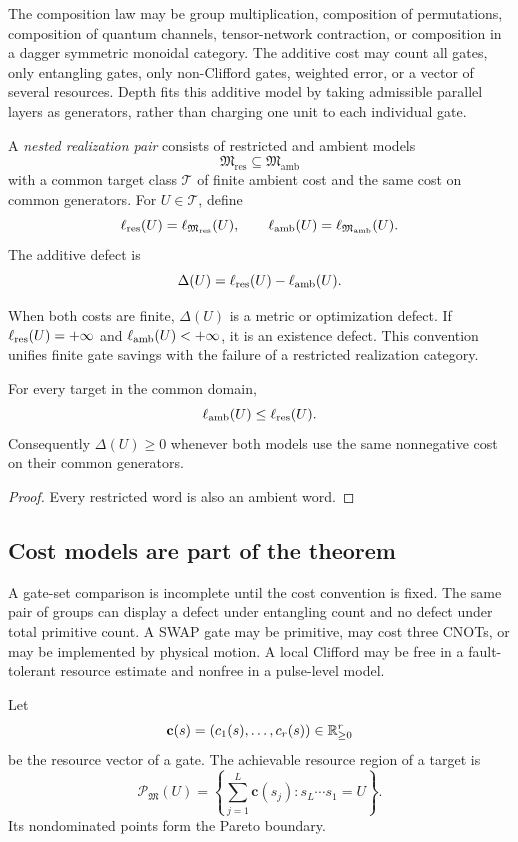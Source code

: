 The composition law may be group multiplication, composition of permutations, composition of quantum channels, tensor-network contraction, or composition in a dagger symmetric monoidal category.  The additive cost may count all gates, only entangling gates, only non-Clifford gates, weighted error, or a vector of several resources.  Depth fits this additive model by taking admissible parallel layers as generators, rather than charging one unit to each individual gate.

\begin{definition}
A \emph{nested realization pair} consists of restricted and ambient models
\[
\mathfrak M_{\mathrm{res}}\subseteq\mathfrak M_{\mathrm{amb}}
\]
with a common target class $\mathcal T$ of finite ambient cost and the same cost on common generators.  For $U\in\mathcal T$, define
\[
\ell_{\mathrm{res}}(U)=\ell_{\mathfrak M_{\mathrm{res}}}(U),
\qquad
\ell_{\mathrm{amb}}(U)=\ell_{\mathfrak M_{\mathrm{amb}}}(U).
\]
The additive defect is
\[
\Delta(U)=\ell_{\mathrm{res}}(U)-\ell_{\mathrm{amb}}(U).
\]
\end{definition}

When both costs are finite, $\Delta(U)$ is a metric or optimization defect.  If $\ell_{\mathrm{res}}(U)=+\infty$ and $\ell_{\mathrm{amb}}(U)<+\infty$, it is an existence defect.  This convention unifies finite gate savings with the failure of a restricted realization category.

\begin{proposition}[Monotonicity]
For every target in the common domain,
\[
\ell_{\mathrm{amb}}(U)\le \ell_{\mathrm{res}}(U).
\]
Consequently $\Delta(U)\ge0$ whenever both models use the same nonnegative cost on their common generators.
\end{proposition}
\begin{proof}
Every restricted word is also an ambient word.
\end{proof}

\subsection{Cost models are part of the theorem}
A gate-set comparison is incomplete until the cost convention is fixed.  The same pair of groups can display a defect under entangling count and no defect under total primitive count.  A SWAP gate may be primitive, may cost three CNOTs, or may be implemented by physical motion.  A local Clifford may be free in a fault-tolerant resource estimate and nonfree in a pulse-level model.

\begin{definition}
Let
\[
\mathbf c(s)=(c_1(s),\ldots,c_r(s))\in\mathbb R_{\ge0}^r
\]
be the resource vector of a gate.  The achievable resource region of a target is
\[
\mathcal P_{\mathfrak M}(U)
=
\left\{
\sum_{j=1}^L\mathbf c(s_j):s_L\cdots s_1=U
\right\}.
\]
Its nondominated points form the Pareto boundary.
\end{definition}

